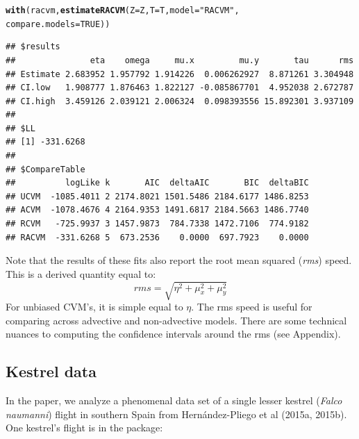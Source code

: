 \documentclass[10pt]{article}\usepackage[]{graphicx}\usepackage[]{color}
\makeatletter
\newcommand{\hlnum}[1]{\textcolor[rgb]{0.686,0.059,0.569}{#1}}%
\newcommand{\hlstr}[1]{\textcolor[rgb]{0.192,0.494,0.8}{#1}}%
\newcommand{\hlstd}[1]{\textcolor[rgb]{0.345,0.345,0.345}{#1}}%
\newcommand{\hlkwc}[1]{\textcolor[rgb]{0.333,0.667,0.333}{#1}}%
\newcommand{\hlkwd}[1]{\textcolor[rgb]{0.737,0.353,0.396}{\textbf{#1}}}%
\newenvironment{kframe}{%
 \def\at@end@of@kframe{}%
 \ifinner\ifhmode%
  \def\at@end@of@kframe{\end{minipage}}%
  \begin{minipage}{\columnwidth}%
 \fi\fi%
 \def\FrameCommand##1{\hskip\@totalleftmargin \hskip-\fboxsep
 \colorbox{shadecolor}{##1}\hskip-\fboxsep
     \hskip-\linewidth \hskip-\@totalleftmargin \hskip\columnwidth}%
 \MakeFramed {\advance\hsize-\width
   \@totalleftmargin\z@ \linewidth\hsize
   \@setminipage}}%
 {\par\unskip\endMakeFramed%
 \at@end@of@kframe}
\newenvironment{knitrout}{}{} %
\makeatother
\begin{document}
  \begin{minipage}{0.6\linewidth}
\begin{knitrout}\footnotesize
{}\color{fgcolor}\begin{kframe}
\begin{alltt}
\hlkwd{with}\hlstd{(racvm,} \hlkwd{estimateRACVM}\hlstd{(}\hlkwc{Z}\hlstd{=Z,} \hlkwc{T}\hlstd{=T,} \hlkwc{model} \hlstd{=} \hlstr{"RACVM"}\hlstd{,}
                          \hlkwc{compare.models}\hlstd{=}\hlnum{TRUE}\hlstd{))}
\end{alltt}
\begin{verbatim}
## $results
##               eta    omega     mu.x         mu.y       tau      rms
## Estimate 2.683952 1.957792 1.914226  0.006262927  8.871261 3.304948
## CI.low   1.908777 1.876463 1.822127 -0.085867701  4.952038 2.672787
## CI.high  3.459126 2.039121 2.006324  0.098393556 15.892301 3.937109
## 
## $LL
## [1] -331.6268
## 
## $CompareTable
##          logLike k       AIC  deltaAIC       BIC  deltaBIC
## UCVM  -1085.4011 2 2174.8021 1501.5486 2184.6177 1486.8253
## ACVM  -1078.4676 4 2164.9353 1491.6817 2184.5663 1486.7740
## RCVM   -725.9937 3 1457.9873  784.7338 1472.7106  774.9182
## RACVM  -331.6268 5  673.2536    0.0000  697.7923    0.0000
\end{verbatim}
\end{kframe}
\end{knitrout}
     \end{minipage}

Note that the results of these fits also report the root mean squared (\emph{rms}) speed.  This is a derived quantity equal to:
$$rms = \sqrt{\eta^2 + \mu_x^2 +\mu_y^2}$$
\noindent For unbiased CVM's, it is simple equal to $\eta$. The rms speed is useful for comparing across advective and non-advective models.  There are some technical nuances to computing the confidence intervals around the rms (see Appendix). 

\subsection{Kestrel data}

In the paper, we analyze a phenomenal data set of a single lesser kestrel (\emph{Falco naumanni}) flight in southern Spain from Hern{\'a}ndez-Pliego et al (2015a, 2015b). One kestrel's flight is in the package:
\end{document}

